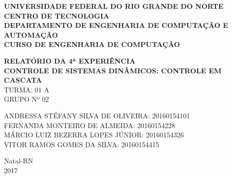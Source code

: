 \documentclass[a4paper,12pt]{article}
\begin{document}
\onehalfspacing

\thispagestyle{empty}

\setcounter{page}{1}


\begin{figure}[!ht]

\centering

\hspace{11.09cm}

\label{Logos}

\end{figure}


\vspace{-1cm}

\begin{center}
{\bf{\normalsize UNIVERSIDADE FEDERAL DO RIO GRANDE DO NORTE\\
CENTRO DE TECNOLOGIA\\
DEPARTAMENTO DE ENGENHARIA DE COMPUTAÇÃO E AUTOMAÇÃO\\
CURSO DE ENGENHARIA DE COMPUTAÇÃO
}}


\vspace{3.6cm}

{\bf{\large RELATÓRIO DA 4ª EXPERIÊNCIA\\
CONTROLE DE SISTEMAS DINÂMICOS: CONTROLE EM CASCATA\\
}}
\vspace{1.5cm}
{\large TURMA: 01 A\\
	GRUPO Nº 02}

\vspace{3.6cm}


\begin{flushright}
\begin{normalsize}
ANDRESSA STÉFANY SILVA DE OLIVEIRA: 20160154101\\
\vspace{0.8cm}
FERNANDA MONTEIRO DE ALMEIDA: 20160154228\\
\vspace{0.8cm}
MÁRCIO LUIZ BEZERRA LOPES JÚNIOR: 20160154326\\
\vspace{0.8cm}
VITOR RAMOS GOMES DA SILVA: 20160154415\\
\end{normalsize}
\end{flushright}


\vspace{2.5cm}

{\large Natal-RN\\
2017}

\end{center}
\end{document}
